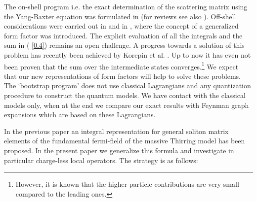 \documentclass[a4paper,a4paper]{article}
\begin{document}
The on-shell program i.e. the exact determination of the scattering matrix
using the Yang-Baxter equation was formulated in \cite{KTTW,KT} (for reviews
see also \cite{K,ZZ}). Off-shell considerations were carried out in \cite
{VG,W} and in \cite{KW,BKW}, where the concept of a generalized form factor
was introduced. The explicit evaluation of all the integrals and the sum in (%
\ref{0.4}) remains an open challenge. A progress towards a solution of this
problem has recently been achieved by Korepin et al. \cite{Korepin}. Up to
now it has even not been proven that the sum over the intermediate states
converges.\footnote{%
However, it is known \cite{CM} that the higher particle contributions are
very small compared to the leading ones.} We expect that our new
representations of form factors will help to solve these problems. The
`bootstrap program' does not use classical Lagrangians and any quantization
procedure to construct the quantum models. We have contact with the
classical models only, when at the end we compare our exact results with
Feynman graph expansions which are based on these Lagrangians.

In the previous paper \cite{BFKZ} an integral representation for general
soliton matrix elements of the fundamental fermi-field of the massive
Thirring model has been proposed. In the present paper we generalize this
formula and investigate in particular charge-less local operators. The
strategy is as follows:
\end{document}
